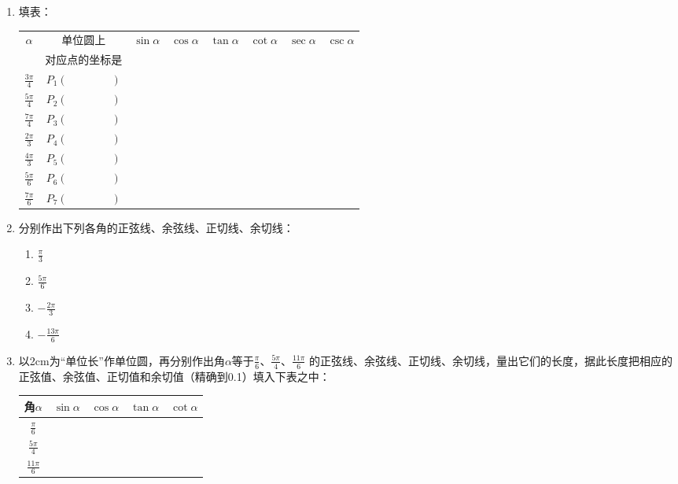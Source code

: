 \begin{enumerate}
    \item 填表：
\begin{center}
\begin{tabular}{c|c|c|c|c|c|c|c}
    \hline
$\alpha$ & 单位圆上 &$\sin\alpha$&$\cos\alpha$&$\tan\alpha$&$\cot\alpha$&$\sec\alpha$&$\csc\alpha$\\
&对应点的坐标是&&&&&& \\
\hline
$\frac{3\pi}{4}$ & $P_1(\qquad \qquad )$&&&&&& \\[1.5ex]
$\frac{5\pi}{4}$ & $P_2(\qquad \qquad )$&&&&&& \\[1.5ex]
$\frac{7\pi}{4}$ & $P_3(\qquad \qquad )$&&&&&& \\[1.5ex]
$\frac{2\pi}{3}$ & $P_4(\qquad \qquad )$&&&&&& \\[1.5ex]
$\frac{4\pi}{3}$ & $P_5(\qquad \qquad )$&&&&&& \\[1.5ex]
$\frac{5\pi}{6}$ & $P_6(\qquad \qquad )$&&&&&& \\[1.5ex]
$\frac{7\pi}{6}$ & $P_7(\qquad \qquad )$&&&&&& \\[1.5ex]
\hline
\end{tabular}
\end{center}    

\item 分别作出下列各角的正弦线、余弦线、正切线、余切线：
\begin{multicols}{4}
\begin{enumerate}[(1)]
    \item $\frac{\pi}{3}$
    \item $\frac{5\pi}{6}$
    \item $-\frac{2\pi}{3}$
    \item $-\frac{13\pi}{6}$
\end{enumerate}
\end{multicols}
\item 以2cm为“单位长”作单位圆，再分别作出角$\alpha$等于$\frac{\pi}{6}$、$\frac{5\pi}{4}$、$\frac{11\pi}{6}$
的正弦线、余弦线、正切线、余切线，量出它们的长度，据此长度把相应的正弦值、余弦值、正切值和余切值（精确到0.1）填入下表之中：
\begin{center}
\begin{tabular}{c|c|c|c|c}
\hline
角$\alpha$ & $\sin\alpha$&$\cos\alpha$&$\tan\alpha$&$\cot\alpha$\\
\hline
$\frac{\pi}{6}$ &&&&\\[1.5ex]
$\frac{5\pi}{4}$ &&&&\\[1.5ex]
$\frac{11\pi}{6}$ &&&&\\[1.5ex]
\hline
\end{tabular}
\end{center}
\end{enumerate}

